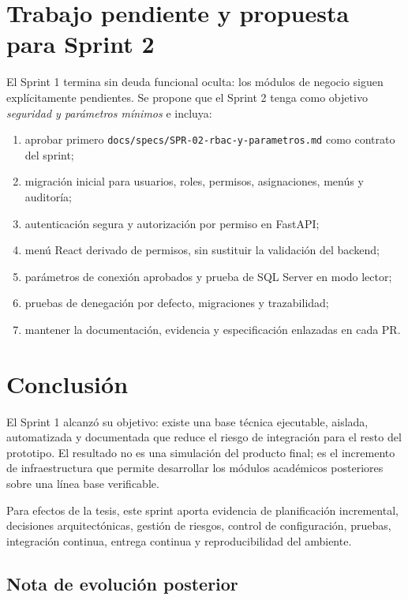 \documentclass[11pt,letterpaper]{article}
\newcommand{\file}[1]{\texttt{#1}}
\begin{document}
\section{Trabajo pendiente y propuesta para Sprint 2}

El Sprint 1 termina sin deuda funcional oculta: los módulos de negocio siguen explícitamente pendientes. Se propone que el Sprint 2 tenga como objetivo \emph{seguridad y parámetros mínimos} e incluya:

\begin{enumerate}
  \item aprobar primero \file{docs/specs/SPR-02-rbac-y-parametros.md} como contrato del sprint;
  \item migración inicial para usuarios, roles, permisos, asignaciones, menús y auditoría;
  \item autenticación segura y autorización por permiso en FastAPI;
  \item menú React derivado de permisos, sin sustituir la validación del backend;
  \item parámetros de conexión aprobados y prueba de SQL Server en modo lector;
  \item pruebas de denegación por defecto, migraciones y trazabilidad;
  \item mantener la documentación, evidencia y especificación enlazadas en cada PR.
\end{enumerate}

\section{Conclusión}

El Sprint 1 alcanzó su objetivo: existe una base técnica ejecutable, aislada, automatizada y documentada que reduce el riesgo de integración para el resto del prototipo. El resultado no es una simulación del producto final; es el incremento de infraestructura que permite desarrollar los módulos académicos posteriores sobre una línea base verificable.

Para efectos de la tesis, este sprint aporta evidencia de planificación incremental, decisiones arquitectónicas, gestión de riesgos, control de configuración, pruebas, integración continua, entrega continua y reproducibilidad del ambiente.

\subsection{Nota de evolución posterior}
\end{document}
